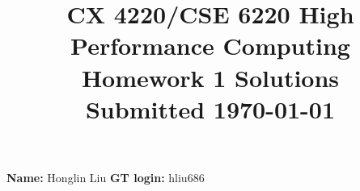 \documentclass[11pt]{article}
\begin{document}
\title{\large\bf \vspace*{-0.3in}CX 4220/CSE 6220 High Performance Computing\\
Homework 1 Solutions\\Submitted \today}
\author{}
\date{}
\maketitle
\vspace*{-0.8in}
{\bf Name:} Honglin Liu \hfill{{\bf GT login:} hliu686}\\
\end{document}
